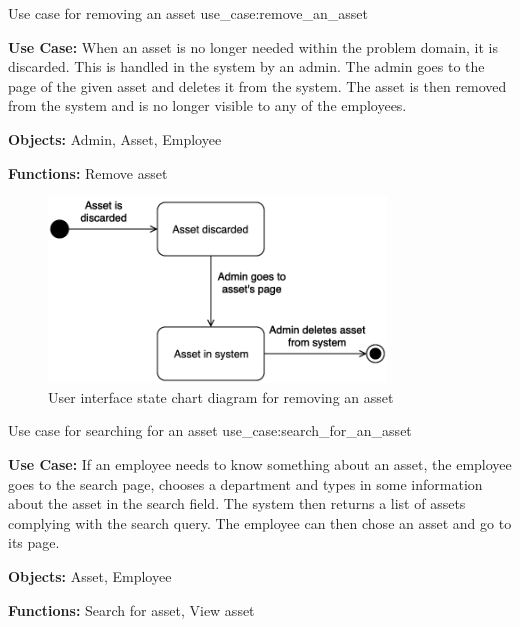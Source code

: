 \newpage

    {Use case for removing an asset}
    {use_case:remove_an_asset}
    {
        \textbf{Use Case:} When an asset is no longer needed within the problem domain, it is discarded. This is handled in the system by an admin. The admin goes to the page of the given asset and deletes it from the system. The asset is then removed from the system and is no longer visible to any of the employees.
    
        \vskip 0.2cm
        
        \textbf{Objects:} Admin, Asset, Employee
        
        \vskip 0.2cm
        
        \textbf{Functions:} Remove asset
    }

\begin{figure}[H]
    \centering
    \includegraphics[width=0.8\textwidth]{figures/UC_Remove_asset.png}
    \caption{User interface state chart diagram for removing an asset}
    \label{fig:remove_asset_statechart}
\end{figure}

\newpage

    {Use case for searching for an asset}
    {use_case:search_for_an_asset}
    {
        \textbf{Use Case:} If an employee needs to know something about an asset, the employee goes to the search page, chooses a department and types in some information about the asset in the search field. The system then returns a list of assets complying with the search query. The employee can then chose an asset and go to its page.
    
        \vskip 0.2cm
        
        \textbf{Objects:} Asset, Employee
        
        \vskip 0.2cm
        
        \textbf{Functions:} Search for asset, View asset
    }

